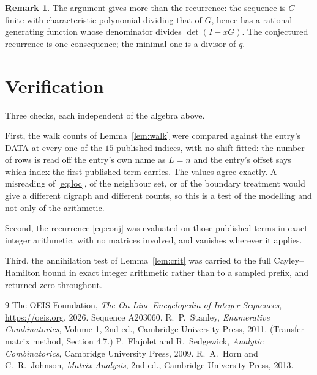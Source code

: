 \documentclass[11pt,a4paper]{article}
\theoremstyle{plain}
\theoremstyle{definition}
\newtheorem{remark}[theorem]{Remark}
\begin{document}
\begin{remark}
The argument gives more than the recurrence: the sequence is $C$-finite with characteristic
polynomial dividing that of $G$, hence has a rational generating function whose denominator
divides $\det(I-xG)$. The conjectured recurrence is one consequence; the minimal one is a
divisor of $q$.
\end{remark}

\section{Verification}

Three checks, each independent of the algebra above.

First, the walk counts of Lemma~\ref{lem:walk} were compared against the entry's DATA at
every one of the $15$ published indices, with no shift fitted: the number of rows is
read off the entry's own name as $L=n$ and the entry's offset says which index the first
published term carries. The values agree exactly. A misreading of \eqref{eq:loc}, of the
neighbour set, or of the boundary treatment would give a different digraph and different
counts, so this is a test of the modelling and not only of the arithmetic.

Second, the recurrence \eqref{eq:conj} was evaluated on those published terms in exact
integer arithmetic, with no matrices involved, and vanishes wherever it applies.

Third, the annihilation test of Lemma~\ref{lem:crit} was carried to the full
Cayley--Hamilton bound in exact integer arithmetic rather than to a sampled prefix, and
returned zero throughout.

\begin{thebibliography}{9}
 The OEIS Foundation, \emph{The On-Line Encyclopedia of Integer
Sequences}, \url{https://oeis.org}, 2026. Sequence A203060.
 R.~P.~Stanley, \emph{Enumerative Combinatorics}, Volume 1, 2nd ed.,
Cambridge University Press, 2011. (Transfer-matrix method, Section 4.7.)
 P.~Flajolet and R.~Sedgewick, \emph{Analytic Combinatorics}, Cambridge
University Press, 2009.
 R.~A.~Horn and C.~R.~Johnson, \emph{Matrix Analysis}, 2nd ed., Cambridge
University Press, 2013.
\end{thebibliography}
\end{document}
